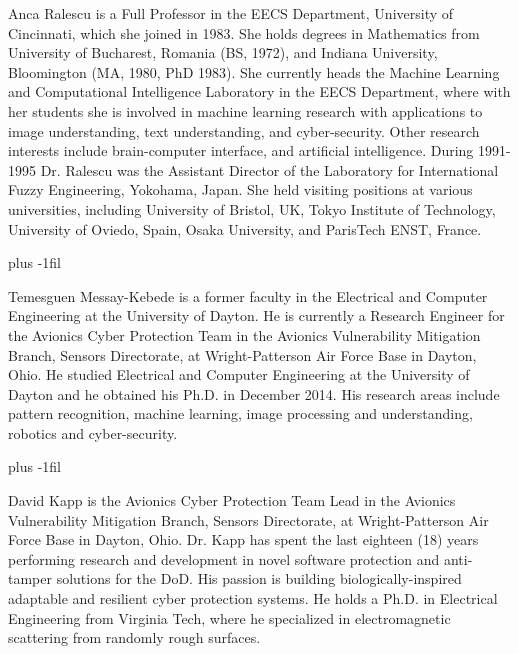 \begin{IEEEbiographynophoto}{Anca Ralescu}
is a Full Professor in the EECS Department, University of Cincinnati, which she joined in 1983.  She holds degrees in Mathematics from University of Bucharest, Romania (BS, 1972), and Indiana University, Bloomington (MA, 1980, PhD 1983).  She currently heads the Machine Learning and Computational Intelligence Laboratory in the EECS Department, where with her students she is involved in machine learning research with applications to image understanding, text understanding, and cyber-security. Other research interests include brain-computer interface, and artificial intelligence. During 1991-1995 Dr. Ralescu was the Assistant Director of the Laboratory for International Fuzzy Engineering, Yokohama, Japan.  She held visiting positions at various universities, including University of Bristol, UK, Tokyo Institute of Technology, University of Oviedo, Spain, Osaka University, and ParisTech ENST, France.
\end{IEEEbiographynophoto}
\vskip 0pt plus -1fil
\begin{IEEEbiographynophoto}{Temesguen Messay-Kebede}
is a former faculty in the Electrical and Computer Engineering at the University of Dayton. He is currently a Research Engineer for the Avionics Cyber Protection Team in the Avionics Vulnerability Mitigation Branch, Sensors Directorate, at Wright-Patterson Air Force Base in Dayton, Ohio. He studied Electrical and Computer Engineering at the University of Dayton and he obtained his Ph.D. in December 2014. His research areas include pattern recognition, machine learning, image processing and understanding, robotics and cyber-security.
\end{IEEEbiographynophoto}
\vskip 0pt plus -1fil
\begin{IEEEbiographynophoto}{David Kapp}
is the Avionics Cyber Protection Team Lead in the Avionics Vulnerability Mitigation Branch, Sensors Directorate, at Wright-Patterson Air Force Base in Dayton, Ohio. Dr. Kapp has spent the last eighteen (18) years performing research and development in novel software protection and anti-tamper solutions for the DoD. His passion is building biologically-inspired adaptable and resilient cyber protection systems. He holds a Ph.D. in Electrical Engineering from Virginia Tech, where he specialized in electromagnetic scattering from randomly rough surfaces.
\end{IEEEbiographynophoto}



